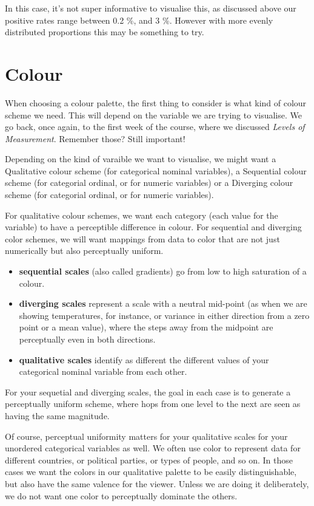 \documentclass[
]{book}
\providecommand{\tightlist}{%
  \setlength{\itemsep}{0pt}\setlength{\parskip}{0pt}}
\begin{document}
In this case, it's not super informative to visualise this, as discussed above our positive rates range between 0.2 \%, and 3 \%. However with more evenly distributed proportions this may be something to try.

\hypertarget{colour}{%
\section{Colour}\label{colour}}

When choosing a colour palette, the first thing to consider is what kind of colour scheme we need. This will depend on the variable we are trying to visualise. We go back, once again, to the first week of the course, where we discussed \emph{Levels of Measurement}. Remember those? Still important!

Depending on the kind of varaible we want to visualise, we might want a Qualitative colour scheme (for categorical nominal variables), a Sequential colour scheme (for categorial ordinal, or for numeric variables) or a Diverging colour scheme (for categorial ordinal, or for numeric variables).

For qualitative colour schemes, we want each category (each value for the variable) to have a perceptible difference in colour. For sequential and diverging color schemes, we will want mappings from data to color that are not just numerically but also perceptually uniform.

\begin{itemize}
\tightlist
\item
  \textbf{sequential scales} (also called gradients) go from low to high saturation of a colour.
\item
  \textbf{diverging scales} represent a scale with a neutral mid-point (as when we are showing temperatures, for instance, or variance in either direction from a zero point or a mean value), where the steps away from the midpoint are perceptually even in both directions.
\item
  \textbf{qualitative scales} identify as different the different values of your categorical nominal variable from each other.
\end{itemize}

For your sequetial and diverging scales, the goal in each case is to generate a perceptually uniform scheme, where hops from one level to the next are seen as having the same magnitude.

Of course, perceptual uniformity matters for your qualitative scales for your unordered categorical variables as well. We often use color to represent data for different countries, or political parties, or types of people, and so on. In those cases we want the colors in our qualitative palette to be easily distinguishable, but also have the same valence for the viewer. Unless we are doing it deliberately, we do not want one color to perceptually dominate the others.
\end{document}
